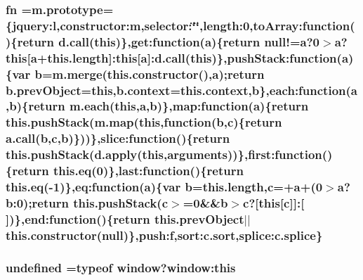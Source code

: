 \hypertarget{static_2root_2js_2jquery-1_811_81_8min_8js_ab2836ee14921cbd6e34ea91a9a99ad66}{
\subsubsection[{fn}]{ fn ={\bf m.\-prototype}=\{jquery\-:l,constructor\-:m,selector\-:\char`\"{}\char`\"{},length\-:0,to\-Array\-:function()\{return {\bf d.\-call}(this)\},get\-:function({\bf a})\{return null!={\bf a}?0$>${\bf a}?this\mbox{[}{\bf a}+this.\-length\mbox{]}\-:this\mbox{[}{\bf a}\mbox{]}\-:{\bf d.\-call}(this)\},push\-Stack\-:function({\bf a})\{var {\bf b}=m.\-merge(this.\-constructor(),{\bf a});return b.\-prev\-Object=this,b.\-context=this.\-context,{\bf b}\},each\-:function({\bf a},{\bf b})\{return {\bf m.\-each}(this,{\bf a},{\bf b})\},map\-:function({\bf a})\{return this.\-push\-Stack(m.\-map(this,function({\bf b},{\bf c})\{return {\bf a.\-call}({\bf b},{\bf c},{\bf b})\}))\},slice\-:function()\{return this.\-push\-Stack(d.\-apply(this,arguments))\},first\-:function()\{return this.\-eq(0)\},last\-:function()\{return this.\-eq(-\/1)\},eq\-:function({\bf a})\{var {\bf b}=this.\-length,{\bf c}=+{\bf a}+(0$>${\bf a}?b\-:0);return this.\-push\-Stack({\bf c}$>$=0\&\&{\bf b}$>${\bf c}?\mbox{[}this\mbox{[}{\bf c}\mbox{]}\mbox{]}\-:\mbox{[}$\,$\mbox{]})\},end\-:function()\{return this.\-prev\-Object$\vert$$\vert$this.\-constructor(null)\},push\-:f,sort\-:c.\-sort,splice\-:c.\-splice\}}}\label{static_2root_2js_2jquery-1_811_81_8min_8js_ab2836ee14921cbd6e34ea91a9a99ad66}
\hypertarget{static_2root_2js_2jquery-1_811_81_8min_8js_ae21cc36bf0d65014c717a481a3f8a468}{
\subsubsection[{undefined}]{\setlength{\rightskip}{0pt plus 5cm}undefined =typeof {\bf window}?window\-:this}}\label{static_2root_2js_2jquery-1_811_81_8min_8js_ae21cc36bf0d65014c717a481a3f8a468}
